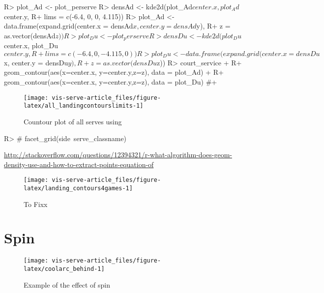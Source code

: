 \documentclass[article]{jss}
\begin{document}
\begin{CodeChunk}
\begin{CodeInput}
R> plot_Ad <- plot_perserve %
R> densAd <- kde2d(plot_Ad$center.x, plot_Ad$center.y, 
R+               lims = c(-6.4, 0, 0, 4.115))
R> plot_Ad <- data.frame(expand.grid(center.x = densAd$x, center.y = densAd$y),
R+                      z = as.vector(densAd$z))
R> plot_Du <- plot_perserve %
R> densDu <- kde2d(plot_Du$center.x, plot_Du$center.y, 
R+               lims = c(-6.4, 0, -4.115, 0))
R> plot_Du <- data.frame(expand.grid(center.x = densDu$x, center.y = densDu$y),
R+                      z = as.vector(densDu$z))
R> court_service + 
R+   geom_contour(aes(x=center.x, y=center.y,z=z), data = plot_Ad) +
R+   geom_contour(aes(x=center.x, y=center.y,z=z), data = plot_Du) #+ 
\end{CodeInput}
\begin{figure}

{\centering \texttt{[image: vis-serve-article\_files/figure-latex/all\_landingcontourslimits-1]} 

}

\caption[Countour plot of all serves using ]{Countour plot of all serves using }\label{fig:all_landingcontourslimits}
\end{figure}
\begin{CodeInput}
R>   # facet_grid(side~serve_classname)
\end{CodeInput}
\end{CodeChunk}

\url{http://stackoverflow.com/questions/12394321/r-what-algorithm-does-geom-density-use-and-how-to-extract-points-equation-of}

\begin{CodeChunk}
\begin{figure}

{\centering \texttt{[image: vis-serve-article\_files/figure-latex/landing\_contours4games-1]} 

}

\caption[To Fixx]{To Fixx}\label{fig:landing_contours4games}
\end{figure}
\end{CodeChunk}

\section{Spin}\label{spin}

\begin{CodeChunk}
\begin{figure}

{\centering \texttt{[image: vis-serve-article\_files/figure-latex/coolarc\_behind-1]} 

}

\caption[Example of the effect of spin]{Example of the effect of spin}\label{fig:coolarc_behind}
\end{figure}
\end{CodeChunk}
\end{document}
